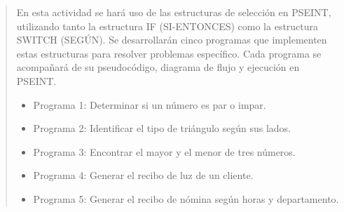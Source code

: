 \documentclass[
	spanish, %
	letterpaper, oneside
]{article}
\begin{document}




\inserttitle



\begin{abstract}

	En esta actividad se hará uso de las estructuras de selección en PSEINT, utilizando tanto la estructura IF (SI-ENTONCES) como la estructura SWITCH (SEGÚN). Se desarrollarán cinco programas que implementen estas estructuras para resolver problemas específico. Cada programa se acompañará de su pseudocódigo, diagrama de flujo y ejecución en PSEINT.
	
	\begin{itemize}
	    \item Programa 1: Determinar si un número es par o impar.
	    \item Programa 2: Identificar el tipo de triángulo según sus lados.
	    \item Programa 3: Encontrar el mayor y el menor de tres números.
	    \item Programa 4: Generar el recibo de luz de un cliente.
	    \item Programa 5: Generar el recibo de nómina según horas y departamento.
	\end{itemize}

\end{abstract}
\end{document}
